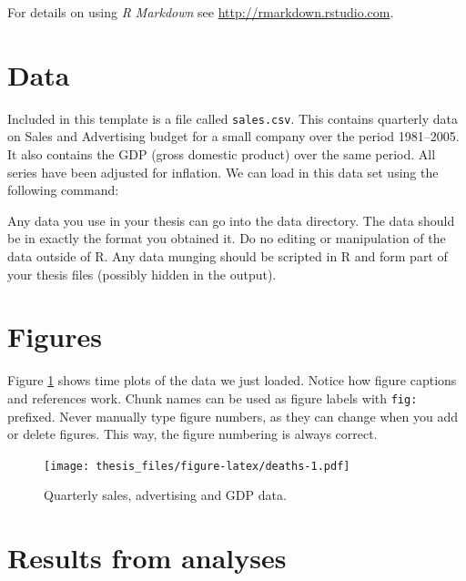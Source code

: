 \documentclass{aucklandthesis}
\begin{document}
For details on using \emph{R Markdown} see \url{http://rmarkdown.rstudio.com}.

\hypertarget{data}{%
\section{Data}\label{data}}

Included in this template is a file called \texttt{sales.csv}. This contains quarterly data on Sales and Advertising budget for a small company over the period 1981--2005. It also contains the GDP (gross domestic product) over the same period. All series have been adjusted for inflation. We can load in this data set using the following command:

\begin{Shaded}
\begin{Highlighting}[]
\StringTok{ }\NormalTok{(}\NormalTok{(}\NormalTok{)[, }\NormalTok{], } \NormalTok{, } \NormalTok{)}
\end{Highlighting}
\end{Shaded}

Any data you use in your thesis can go into the data directory. The data should be in exactly the format you obtained it. Do no editing or manipulation of the data outside of R. Any data munging should be scripted in R and form part of your thesis files (possibly hidden in the output).

\hypertarget{figures}{%
\section{Figures}\label{figures}}

Figure \ref{fig:deaths} shows time plots of the data we just loaded. Notice how figure captions and references work. Chunk names can be used as figure labels with \texttt{fig:} prefixed. Never manually type figure numbers, as they can change when you add or delete figures. This way, the figure numbering is always correct.

\begin{figure}
\centering
\texttt{[image: thesis\_files/figure-latex/deaths-1.pdf]}
\caption{\label{fig:deaths}Quarterly sales, advertising and GDP data.}
\end{figure}

\hypertarget{results-from-analyses}{%
\section{Results from analyses}\label{results-from-analyses}}
\end{document}
